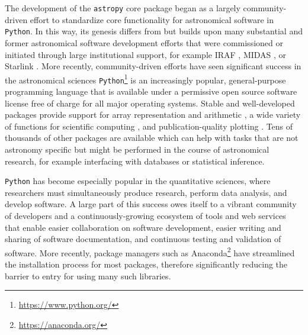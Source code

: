 \documentclass[modern]{aastex61}
\newcommand{\package}[1]{\texttt{#1}\xspace}
\newcommand{\python}{\package{Python}}
\newcommand{\astropypkg}{\package{astropy}}
\newcommand{\inlinecomment}[2]{\todo[inline]{#1: #2}\xspace}
\begin{document}

The development of the \astropypkg core package began as a largely
community-driven effort to standardize core functionality for astronomical
software in \python.
In this way, its genesis differs from but builds upon many substantial and
%
%
%
former astronomical software development efforts that were commissioned or
initiated through large institutional support, for example IRAF \citep[developed
at NOAO;][]{IRAF}, MIDAS \citep[developed at ESO;][]{MIDAS}, or Starlink
\citep[originally developed by a consortium of UK institutions and now
maintained by the East Asian Observatory;][]{starlink1982,starlink2013}.
More recently, community-driven efforts have seen significant success in the astronomical sciences \citep{yt}
%
\python\footnote{\url{https://www.python.org/}} is an increasingly popular,
general-purpose programming language that is available under a permissive open
source software license free of charge for all major operating systems.
Stable and well-developed packages provide support for array representation and arithmetic
\citep[\package{numpy};][]{numpy}, a wide variety of functions for scientific
computing \citep[\package{scipy};][]{numpy}, and publication-quality plotting
\citep[\package{matplotlib};][]{matplotlib}. Tens of thousands of other packages
are available which can help with tasks that are not astronomy specific but
might be performed in the course of astronomical research, for example interfacing with databases or statistical inference.

\python has become especially popular in the quantitative sciences,
where researchers must simultaneously produce research, perform data analysis,
and develop software.
A large part of this success owes itself to a vibrant community of developers
and a continuously-growing ecosystem of tools and web services that enable
easier collaboration on software development, easier writing and sharing of
software documentation, and continuous testing and validation of software.
More recently, package managers such as
Anaconda\footnote{\url{https://anaconda.org/}} have streamlined the installation
process for most packages, therefore significantly reducing the barrier to entry
for using many such libraries.
\end{document}
